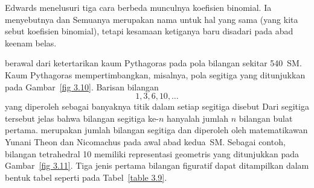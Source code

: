 \par Edwards menelusuri tiga cara berbeda munculnya koefisien binomial.  Ia menyebutnya
  dan 
Semuanya merupakan nama untuk hal yang sama (yang kita sebut koefisien binomial), tetapi
kesamaan ketiganya baru disadari pada abad keenam belas.

 berawal dari ketertarikan kaum
Pythagoras pada pola bilangan sekitar 540~{\footnotesize{SM}.}   Kaum Pythagoras
mempertimbangkan, misalnya, pola segitiga yang ditunjukkan pada Gambar~\ref{fig 3.10}.
Barisan bilangan
$$ 1, 3, 6, 10, \dots
$$ yang diperoleh sebagai banyaknya titik dalam setiap segitiga disebut   Dari segitiga tersebut jelas bahwa bilangan
segitiga ke-$n$ hanyalah jumlah $n$ bilangan bulat pertama.  
 merupakan jumlah bilangan segitiga dan diperoleh oleh
matematikawan Yunani Theon dan Nicomachus pada awal abad kedua~{\footnotesize{SM}.}
Sebagai contoh, bilangan tetrahedral 10 memiliki representasi geometris yang ditunjukkan
pada Gambar~\ref{fig 3.11}.  Tiga jenis pertama bilangan figuratif dapat ditampilkan
dalam bentuk tabel seperti pada Tabel~\ref{table 3.9}.




